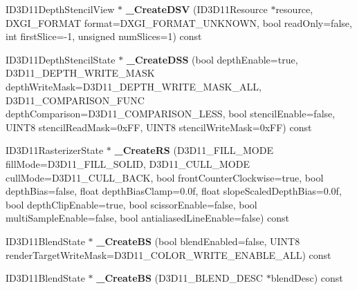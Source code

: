 \begin{DoxyCompactItemize}
\item 
I\+D3\+D11\+Depth\+Stencil\+View $\ast$ {\bfseries \+\_\+\+Create\+D\+SV} (I\+D3\+D11\+Resource $\ast$resource, D\+X\+G\+I\+\_\+\+F\+O\+R\+M\+AT format=D\+X\+G\+I\+\_\+\+F\+O\+R\+M\+A\+T\+\_\+\+U\+N\+K\+N\+O\+WN, bool read\+Only=false, int first\+Slice=-\/1, unsigned num\+Slices=1) const \hypertarget{class_ensum_1_1_graphics_1_1_direct3_d11_a2309142b6f9de0233a05156e0f282eaa}{}\label{class_ensum_1_1_graphics_1_1_direct3_d11_a2309142b6f9de0233a05156e0f282eaa}

\item 
I\+D3\+D11\+Depth\+Stencil\+State $\ast$ {\bfseries \+\_\+\+Create\+D\+SS} (bool depth\+Enable=true, D3\+D11\+\_\+\+D\+E\+P\+T\+H\+\_\+\+W\+R\+I\+T\+E\+\_\+\+M\+A\+SK depth\+Write\+Mask=D3\+D11\+\_\+\+D\+E\+P\+T\+H\+\_\+\+W\+R\+I\+T\+E\+\_\+\+M\+A\+S\+K\+\_\+\+A\+LL, D3\+D11\+\_\+\+C\+O\+M\+P\+A\+R\+I\+S\+O\+N\+\_\+\+F\+U\+NC depth\+Comparison=D3\+D11\+\_\+\+C\+O\+M\+P\+A\+R\+I\+S\+O\+N\+\_\+\+L\+E\+SS, bool stencil\+Enable=false, U\+I\+N\+T8 stencil\+Read\+Mask=0x\+F\+F, U\+I\+N\+T8 stencil\+Write\+Mask=0x\+F\+F) const \hypertarget{class_ensum_1_1_graphics_1_1_direct3_d11_aa6c5d4175898eb21915b1402719d44ee}{}\label{class_ensum_1_1_graphics_1_1_direct3_d11_aa6c5d4175898eb21915b1402719d44ee}

\item 
I\+D3\+D11\+Rasterizer\+State $\ast$ {\bfseries \+\_\+\+Create\+RS} (D3\+D11\+\_\+\+F\+I\+L\+L\+\_\+\+M\+O\+DE fill\+Mode=D3\+D11\+\_\+\+F\+I\+L\+L\+\_\+\+S\+O\+L\+ID, D3\+D11\+\_\+\+C\+U\+L\+L\+\_\+\+M\+O\+DE cull\+Mode=D3\+D11\+\_\+\+C\+U\+L\+L\+\_\+\+B\+A\+CK, bool front\+Counter\+Clockwise=true, bool depth\+Bias=false, float depth\+Bias\+Clamp=0.\+0f, float slope\+Scaled\+Depth\+Bias=0.\+0f, bool depth\+Clip\+Enable=true, bool scissor\+Enable=false, bool multi\+Sample\+Enable=false, bool antialiased\+Line\+Enable=false) const \hypertarget{class_ensum_1_1_graphics_1_1_direct3_d11_a1e93657992eb91b0aa9eaa8d9f96a03e}{}\label{class_ensum_1_1_graphics_1_1_direct3_d11_a1e93657992eb91b0aa9eaa8d9f96a03e}

\item 
I\+D3\+D11\+Blend\+State $\ast$ {\bfseries \+\_\+\+Create\+BS} (bool blend\+Enabled=false, U\+I\+N\+T8 render\+Target\+Write\+Mask=D3\+D11\+\_\+\+C\+O\+L\+O\+R\+\_\+\+W\+R\+I\+T\+E\+\_\+\+E\+N\+A\+B\+L\+E\+\_\+\+A\+LL) const \hypertarget{class_ensum_1_1_graphics_1_1_direct3_d11_a88e514dd663ddcc229a6b61fe6adf19e}{}\label{class_ensum_1_1_graphics_1_1_direct3_d11_a88e514dd663ddcc229a6b61fe6adf19e}

\item 
I\+D3\+D11\+Blend\+State $\ast$ {\bfseries \+\_\+\+Create\+BS} (D3\+D11\+\_\+\+B\+L\+E\+N\+D\+\_\+\+D\+E\+SC $\ast$blend\+Desc) const \hypertarget{class_ensum_1_1_graphics_1_1_direct3_d11_a54184d338e4dd0753ee177eadb726da8}{}\label{class_ensum_1_1_graphics_1_1_direct3_d11_a54184d338e4dd0753ee177eadb726da8}

\end{DoxyCompactItemize}
